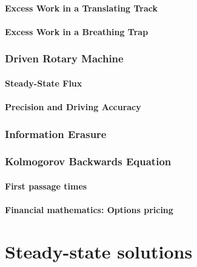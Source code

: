 \documentclass[15pt]{article}
\begin{document}
    \subsection{Excess Work in a Translating Track}

    \subsection{Excess Work in a Breathing Trap}


    \section{Driven Rotary Machine}

    \subsection{Steady-State Flux}

    \subsection{Precision and Driving Accuracy}

    \section{Information Erasure}

    \section{Kolmogorov Backwards Equation}

    \subsection{First passage times}

    \subsection{Financial mathematics: Options pricing}


\part{Steady-state solutions}

\end{document}
